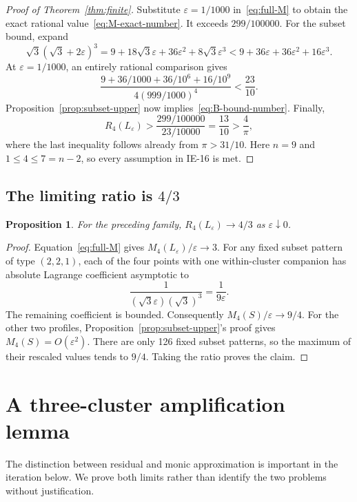 \documentclass[11pt,a4paper]{article}
\newtheorem{proposition}[theorem]{Proposition}
\theoremstyle{remark}
\newcommand{\eps}{\varepsilon}
\begin{document}
\begin{proof}[Proof of Theorem~\ref{thm:finite}]
Substitute $\eps=1/1000$ in~\eqref{eq:full-M} to obtain the exact rational
value~\eqref{eq:M-exact-number}. It exceeds $299/100000$.
For the subset bound, expand
\[
 \sqrt3(\sqrt3+2\eps)^3
 =9+18\sqrt3\eps+36\eps^2+8\sqrt3\eps^3
 <9+36\eps+36\eps^2+16\eps^3.
\]
At $\eps=1/1000$, an entirely rational comparison gives
\[
 \frac{9+36/1000+36/10^6+16/10^9}{4(999/1000)^4}<\frac{23}{10}.
\]
Proposition~\ref{prop:subset-upper} now implies~\eqref{eq:B-bound-number}.
Finally,
\[
 R_4(L_\eps)>
 \frac{299/100000}{23/10000}=\frac{13}{10}>\frac4\pi,
\]
where the last inequality follows already from $\pi>31/10$.
Here $n=9$ and $1\le4\le7=n-2$, so every assumption in IE-16 is met.
\end{proof}

\subsection{The limiting ratio is \texorpdfstring{$4/3$}{4/3}}
\begin{proposition}\label{prop:four-thirds}
For the preceding family, $R_4(L_\eps)\longrightarrow4/3$ as $\eps\downarrow0$.
\end{proposition}
\begin{proof}
Equation~\eqref{eq:full-M} gives $M_4(L_\eps)/\eps\to3$.
For any fixed subset pattern of type $(2,2,1)$, each of the four points with
one within-cluster companion has absolute Lagrange coefficient asymptotic to
\[
 \frac1{(\sqrt3\eps)(\sqrt3)^3}=\frac1{9\eps}.
\]
The remaining coefficient is bounded. Consequently
$M_4(S)/\eps\to9/4$.
For the other two profiles, Proposition~\ref{prop:subset-upper}'s proof gives
$M_4(S)=O(\eps^2)$. There are only 126 fixed subset patterns, so the maximum
of their rescaled values tends to $9/4$. Taking the ratio proves the claim.
\end{proof}

\section{A three-cluster amplification lemma}
The distinction between residual and monic approximation is important in the
iteration below. We prove both limits rather than identify the two problems
without justification.
\end{document}
